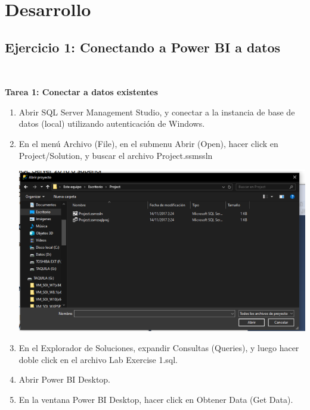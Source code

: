 \section{Desarrollo}

\begin{itemize}
\subsection{Ejercicio 1:  Conectando a Power BI a datos}\\

\begin{itemize}
\textbf{Tarea 1: Conectar a datos existentes}
\end{itemize} 

\begin{enumerate}
    \item Abrir SQL Server Management Studio, y conectar a la instancia de base de datos (local) utilizando autenticación de Windows.
    
    
    \item En el menú Archivo (File), en el submenu Abrir (Open), hacer click en Project/Solution, y buscar el archivo Project.ssmssln
    
    \begin{center}
	\includegraphics[width=13cm]{./Imagenes/1}
	\end{center}
    
    
    \item En el Explorador de Soluciones, expandir Consultas (Queries), y luego hacer doble click en el archivo Lab Exercise 1.sql.   
    \item Abrir Power BI Desktop.
    
    
    \item En la ventana Power BI Desktop, hacer click en Obtener Data (Get Data).


\end{enumerate}
\end{itemize}
